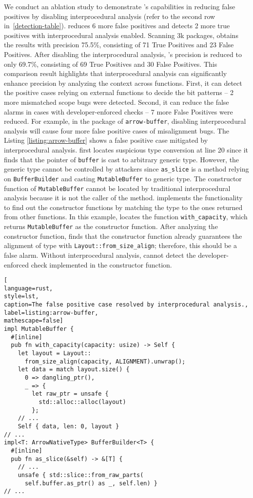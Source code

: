 We conduct an ablation study to demonstrate \TN{}'s capabilities in reducing false positives by disabling interprocedural analysis (refer to the second row in~\autoref{detection-table}). \TN{} reduces 6 more false positives and detects 2 more true positives with interprocedural analysis enabled. Scanning 3k packages, \TN obtains the results with precision {75.5\%}, consisting of {71} True Positives and {23} False Positives. After disabling the interprocedural analysis, \TN's precision is reduced to only {69.7\%}, consisting of {69} True Positives and {30} False Positives. This comparison result highlights that interprocedural analysis can significantly enhance precision by analyzing the context across functions. First, it can detect the positive cases relying on external functions to decide the bit patterns -- 2 more mismatched scope bugs were detected. Second, it can reduce the false alarms in cases with developer-enforced checks -- {7 more False Positives were reduced}. For example, in the package of \texttt{arrow-buffer}, disabling interprocedural analysis will cause four more false positive cases of misalignment bugs. The Listing \ref{listing:arrow-buffer} shows a false positive case mitigated by interprocedural analysis. \TN first locates suspicious type conversion at line 20 since it finds that the pointer of \texttt{buffer} is cast to arbitrary generic type. However, the generic type cannot be controlled by attackers since \texttt{as\_slice} is a method relying on \texttt{BufferBuilder} and casting \texttt{MutableBuffer} to generic type. The constructor function of \texttt{MutableBuffer} cannot be located by traditional interprocedural analysis because it is not the caller of the method. \TN implements the functionality to find out the constructor functions by matching the type to the ones returned from other functions. In this example, \TN locates the function \texttt{with\_capacity}, which returns \texttt{MutableBuffer} as the constructor function. After analyzing the constructor function, \TN finds that the constructor function already guarantees the alignment of type with \texttt{Layout::from\_size\_align}; therefore, this should be a false alarm. Without interprocedural analysis, \TN cannot detect the developer-enforced check implemented in the constructor function.





\begin{lstlisting}[
language=rust, 
style=lst,
caption=The false positive case resolved by interprocedural analysis.,
label=listing:arrow-buffer,
mathescape=false]
impl MutableBuffer {
  #[inline]
  pub fn with_capacity(capacity: usize) -> Self {
    let layout = Layout::
      from_size_align(capacity, ALIGNMENT).unwrap();
    let data = match layout.size() {
      0 => dangling_ptr(),
      _ => {
        let raw_ptr = unsafe { 
          std::alloc::alloc(layout) 
        };
    // ...
    Self { data, len: 0, layout }
// ...
impl<T: ArrowNativeType> BufferBuilder<T> {
  #[inline]
  pub fn as_slice(&self) -> &[T] {
    // ...
    unsafe { std::slice::from_raw_parts(
      self.buffer.as_ptr() as _, self.len) }
// ...
\end{lstlisting}






